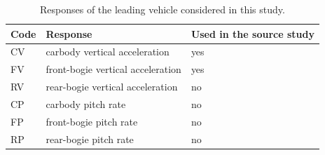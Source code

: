 \begin{table}[htbp]
\centering
\caption{Responses of the leading vehicle considered in this study.}
\label{tab:channels}
\small
\begin{tabular}{lll}
\toprule
Code & Response & Used in the source study \\
\midrule
CV & carbody vertical acceleration & yes \\
FV & front-bogie vertical acceleration & yes \\
RV & rear-bogie vertical acceleration & no \\
CP & carbody pitch rate & no \\
FP & front-bogie pitch rate & no \\
RP & rear-bogie pitch rate & no \\
\bottomrule
\end{tabular}
\end{table}
